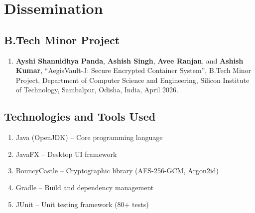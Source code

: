 \setcounter{equation}{0}
\thispagestyle{plain}
\renewcommand{\chaptermark}[1]{ \markboth{#1}{} }
\renewcommand{\sectionmark}[1]{ \markright{#1} }
\renewcommand{\headrulewidth}{0.4pt} %
\renewcommand{\footrulewidth}{0.4pt}
\fancyfoot[RO,LE]{\thepage}

\chapter*{Dissemination}
\section*{B.Tech Minor Project}
\begin{enumerate}
	\item \textbf{Ayshi Shannidhya Panda}, \textbf{Ashish Singh}, \textbf{Avee Ranjan}, and \textbf{Ashish Kumar}, ``AegisVault-J: Secure Encrypted Container System'', B.Tech Minor Project, Department of Computer Science and Engineering, Silicon Institute of Technology, Sambalpur, Odisha, India, April 2026.
\end{enumerate}

\section*{Technologies and Tools Used}
\begin{enumerate}
	\item Java (OpenJDK) -- Core programming language
	\item JavaFX -- Desktop UI framework
	\item BouncyCastle -- Cryptographic library (AES-256-GCM, Argon2id)
	\item Gradle -- Build and dependency management
	\item JUnit -- Unit testing framework (80+ tests)
\end{enumerate}
